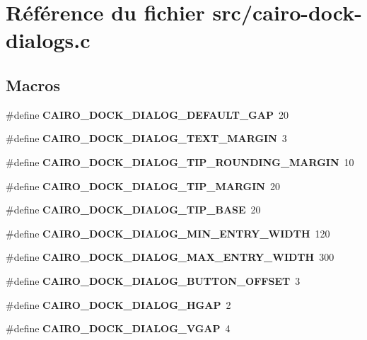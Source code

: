 \section{R\'{e}f\'{e}rence du fichier src/cairo-dock-dialogs.c}
\label{cairo-dock-dialogs_8c}
\subsection*{Macros}
\begin{CompactItemize}
\item 
\#define {\bf CAIRO\_\-DOCK\_\-DIALOG\_\-DEFAULT\_\-GAP}~20
\item 
\#define {\bf CAIRO\_\-DOCK\_\-DIALOG\_\-TEXT\_\-MARGIN}~3
\item 
\#define {\bf CAIRO\_\-DOCK\_\-DIALOG\_\-TIP\_\-ROUNDING\_\-MARGIN}~10
\item 
\#define {\bf CAIRO\_\-DOCK\_\-DIALOG\_\-TIP\_\-MARGIN}~20
\item 
\#define {\bf CAIRO\_\-DOCK\_\-DIALOG\_\-TIP\_\-BASE}~20
\item 
\#define {\bf CAIRO\_\-DOCK\_\-DIALOG\_\-MIN\_\-ENTRY\_\-WIDTH}~120
\item 
\#define {\bf CAIRO\_\-DOCK\_\-DIALOG\_\-MAX\_\-ENTRY\_\-WIDTH}~300
\item 
\#define {\bf CAIRO\_\-DOCK\_\-DIALOG\_\-BUTTON\_\-OFFSET}~3
\item 
\#define {\bf CAIRO\_\-DOCK\_\-DIALOG\_\-HGAP}~2
\item 
\#define {\bf CAIRO\_\-DOCK\_\-DIALOG\_\-VGAP}~4
\end{CompactItemize}
